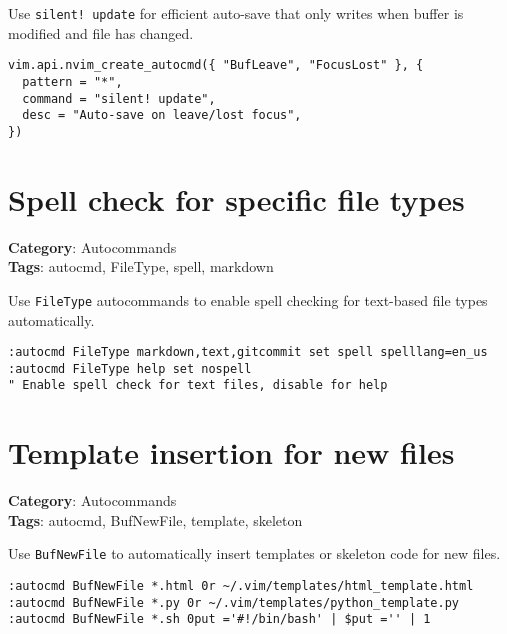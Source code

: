 {Use {\footnotesize \Verb§silent! update§} for efficient auto-save that only writes when buffer is modified and file has changed.

\begin{Exa*}{}
\begin{Verbatim}[fontsize=\footnotesize, breaklines, breakanywhere]
vim.api.nvim_create_autocmd({ "BufLeave", "FocusLost" }, {
  pattern = "*",
  command = "silent! update",
  desc = "Auto-save on leave/lost focus",
})
\end{Verbatim}
\end{Exa*}

\section{Spell check for specific file types}

\textbf{Category}: Autocommands\\ \textbf{Tags}: autocmd, FileType, spell, markdown
\vspace{0.5cm}

Use {\footnotesize \Verb§FileType§} autocommands to enable spell checking for text-based file types automatically.

\begin{Exa*}{}
\begin{Verbatim}[fontsize=\footnotesize, breaklines, breakanywhere]
:autocmd FileType markdown,text,gitcommit set spell spelllang=en_us
:autocmd FileType help set nospell
" Enable spell check for text files, disable for help
\end{Verbatim}
\end{Exa*}

\section{Template insertion for new files}

\textbf{Category}: Autocommands\\ \textbf{Tags}: autocmd, BufNewFile, template, skeleton
\vspace{0.5cm}

Use {\footnotesize \Verb§BufNewFile§} to automatically insert templates or skeleton code for new files.

\begin{Exa*}{}
\begin{Verbatim}[fontsize=\footnotesize, breaklines, breakanywhere]
:autocmd BufNewFile *.html 0r ~/.vim/templates/html_template.html
:autocmd BufNewFile *.py 0r ~/.vim/templates/python_template.py
:autocmd BufNewFile *.sh 0put ='#!/bin/bash' | $put ='' | 1
\end{Verbatim}
\end{Exa*}

}
